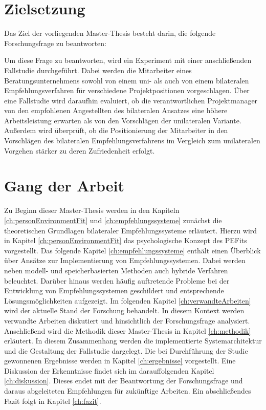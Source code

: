 \newpage
\section{Zielsetzung}
\label{sec:intro:zielsetzung}
Das Ziel der vorliegenden Master-Thesis besteht darin, die folgende Forschungsfrage zu beantworten:

\forschungsfrage

Um diese Frage zu beantworten, wird ein Experiment mit einer anschließenden Fallstudie durchgeführt. Dabei werden die Mitarbeiter eines Beratungsunternehmens sowohl von einem uni- als auch von einem bilateralen Empfehlungsverfahren für verschiedene Projektpositionen vorgeschlagen. Über eine Fallstudie wird daraufhin evaluiert, ob die verantwortlichen Projektmanager von den empfohlenen Angestellten des bilateralen Ansatzes eine höhere Arbeitsleistung erwarten als von den Vorschlägen der unilateralen Variante. Außerdem wird überprüft, ob die Positionierung der Mitarbeiter in den Vorschlägen des bilateralen Empfehlungsverfahrens im Vergleich zum unilateralen Vorgehen stärker zu deren Zufriedenheit erfolgt.

\section{Gang der Arbeit}
\label{sec:intro:gangDerArbeit}
Zu Beginn dieser Master-Thesis werden in den Kapiteln \ref{ch:personEnvironmentFit} und \ref{ch:empfehlungssysteme} zunächst die theoretischen Grundlagen bilateraler Empfehlungssysteme erläutert. Hierzu wird in Kapitel \ref{ch:personEnvironmentFit} das psychologische Konzept des \acp{PEFit} vorgestellt. Das folgende Kapitel \ref{ch:empfehlungssysteme} enthält einen Überblick über Ansätze zur Implementierung von Empfehlungssystemen. Dabei werden neben modell- und speicherbasierten Methoden auch hybride Verfahren beleuchtet. Darüber hinaus werden häufig auftretende Probleme bei der Entwicklung von Empfehlungssystemen geschildert und entsprechende Lösungsmöglichkeiten aufgezeigt. Im folgenden Kapitel \ref{ch:verwandteArbeiten} wird der aktuelle Stand der Forschung behandelt. In diesem Kontext werden verwandte Arbeiten diskutiert und hinsichtlich der Forschungsfrage analysiert. Anschließend wird die Methodik dieser Master-Thesis in Kapitel \ref{ch:methodik} erläutert. In diesem Zusammenhang werden die implementierte Systemarchitektur und die Gestaltung der Fallstudie dargelegt. Die bei Durchführung der Studie gewonnenen Ergebnisse werden in Kapitel \ref{ch:ergebnisse} vorgestellt. Eine Diskussion der Erkenntnisse findet sich im darauffolgenden Kapitel \ref{ch:diskussion}. Dieses endet mit der Beantwortung der Forschungsfrage und daraus abgeleiteten Empfehlungen für zukünftige Arbeiten. Ein abschließendes Fazit folgt in Kapitel \ref{ch:fazit}.
